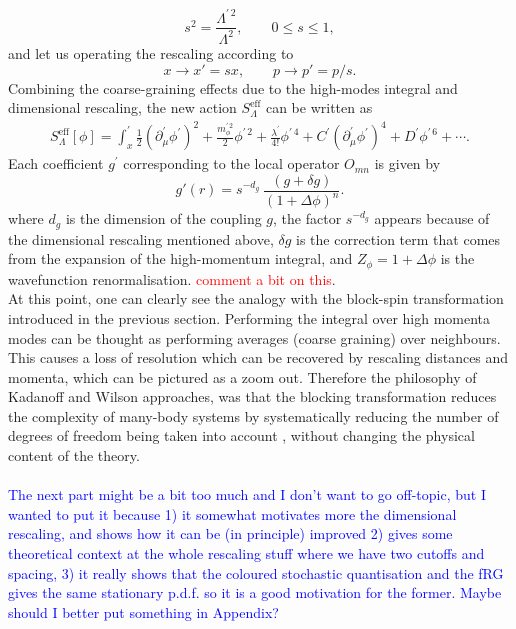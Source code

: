 \begin{equation*}
    s^2 = \frac{\Lambda^{\prime \, 2}}{\Lambda^2}, \qquad 0 \leq s \leq 1,
\end{equation*}
and let us operating the rescaling according to
\begin{equation*}
    x \to x' = sx, \qquad p \to p' = p/s.
\end{equation*}
Combining the coarse-graining effects due to the high-modes integral and dimensional rescaling, the new action $S^\text{eff}_\Lambda$ can be written as \cite{Peskin:1995ev}
\begin{equation*} 
    \begin{aligned} 
        S^\text{eff}_\Lambda[\phi]=\int_x^\prime \frac{1}{2}\left(\partial_\mu^{\prime} \phi^{\prime}\right)^2 + \frac{m_\phi^{\prime \, 2}}{2} \phi^{\prime \, 2}  + \frac{\lambda^\prime}{4 !} \phi^{\prime \, 4}+C^{\prime}\left(\partial_\mu^{\prime} \phi^{\prime}\right)^4+D^{\prime} \phi^{\prime \, 6}+\cdots.
    \end{aligned}
\end{equation*}
Each coefficient $g^\prime$ corresponding to the local operator $O_{mn}$ is given by
\begin{equation}
    g'(r) = s^{-d_g} \ \frac{(g + \delta g)}{(1 + \Delta\phi)^{n}}.
    \label{eq:couplings_redefinition}
\end{equation}
where $d_g$ is the dimension of the coupling $g$, the factor  $s^{-d_g}$ appears because of the dimensional rescaling mentioned above, $\delta g$ is the correction term that comes from the expansion of the high-momentum integral, and $Z_\phi = 1 + \Delta\phi$ is the wavefunction renormalisation. \textcolor{red}{comment a bit on this}. \\
At this point, one can clearly see the analogy with the block-spin transformation introduced in the previous section. Performing the integral over high momenta modes can be thought as performing averages (coarse graining) over neighbours. This causes a loss of resolution which can be recovered by rescaling distances and momenta, which can be pictured as a zoom out.
Therefore the philosophy of Kadanoff and Wilson approaches, was that the blocking transformation reduces the complexity of many-body
systems by systematically reducing the number of degrees of freedom being taken into account \cite{WILSON197475},
without changing the physical content of the theory. \\~\\
\textcolor{blue}{The next part might be a bit too much and I don't want to go off-topic, but I wanted to put it because 1) it somewhat motivates more the dimensional rescaling, and shows how it can be (in principle) improved 2) gives some theoretical context at the whole rescaling stuff where we have two cutoffs and spacing, 3) it really shows that the coloured stochastic quantisation and the fRG gives the same stationary p.d.f. so it is a good motivation for the former. Maybe should I better put something in Appendix? \\}
